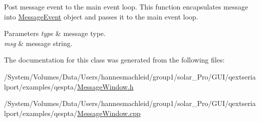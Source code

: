 Post message event to the main event loop. This function encapsulates message into \mbox{\hyperlink{class_message_event}{Message\+Event}} object and passes it to the main event loop. 
\begin{DoxyParams}{Parameters}
{\em type} & message type. \\
\hline
{\em msg} & message string. \\
\hline
\end{DoxyParams}


The documentation for this class was generated from the following files\+:\begin{DoxyCompactItemize}
\item 
/\+System/\+Volumes/\+Data/\+Users/hannesmachleid/group1/solar\+\_\+\+Pro/\+G\+U\+I/qextserialport/examples/qespta/\mbox{\hyperlink{_message_window_8h}{Message\+Window.\+h}}\item 
/\+System/\+Volumes/\+Data/\+Users/hannesmachleid/group1/solar\+\_\+\+Pro/\+G\+U\+I/qextserialport/examples/qespta/\mbox{\hyperlink{_message_window_8cpp}{Message\+Window.\+cpp}}\end{DoxyCompactItemize}
